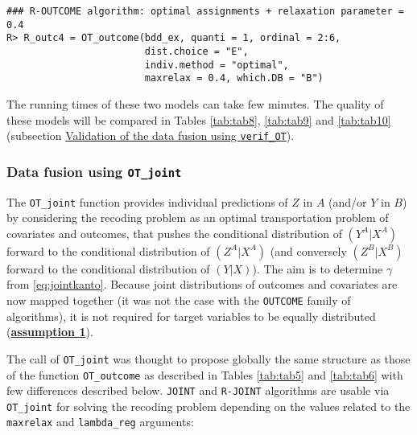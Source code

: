 \begin{verbatim}
### R-OUTCOME algorithm: optimal assignments + relaxation parameter = 0.4
R> R_outc4 = OT_outcome(bdd_ex, quanti = 1, ordinal = 2:6, 
                        dist.choice = "E",
                        indiv.method = "optimal", 
                        maxrelax = 0.4, which.DB = "B")
\end{verbatim}

The running times of these two models can take few minutes. The quality of these models will be compared in Tables \ref{tab:tab8}, \ref{tab:tab9} and \ref{tab:tab10} (subsection \protect\hyperlink{vodf}{Validation of the data fusion using \texttt{verif\_OT}}).

\hypertarget{data-fusion-using-ot_joint}{%
\subsubsection{\texorpdfstring{Data fusion using \texttt{OT\_joint}}{Data fusion using OT\_joint}}\label{data-fusion-using-ot_joint}}

The \texttt{OT\_joint} function provides individual predictions of \(Z\) in \(A\) (and/or \(Y\) in \(B\)) by considering the recoding problem as an optimal transportation problem of covariates and outcomes, that pushes the conditional distribution of \((Y^A|X^A)\) forward to the conditional distribution of \((Z^A|X^A)\) (and conversely \((Z^B|X^B)\) forward to the conditional distribution of \((Y|X)\)). The aim is to determine \(\gamma\) from \eqref{eq:jointkanto}. Because joint distributions of outcomes and covariates are now mapped together (it was not the case with the \texttt{OUTCOME} family of algorithms), it is not required for target variables to be equally distributed (\protect\hyperlink{optt}{\textbf{assumption 1}}).

The call of \texttt{OT\_joint} was thought to propose globally the same structure as those of the function \texttt{OT\_outcome} as described in Tables \ref{tab:tab5} and \ref{tab:tab6} with few differences described below. \texttt{JOINT} and \texttt{R-JOINT} algorithms are usable via \texttt{OT\_joint} for solving the recoding problem depending on the values related to the \texttt{maxrelax} and \texttt{lambda\_reg} arguments:

